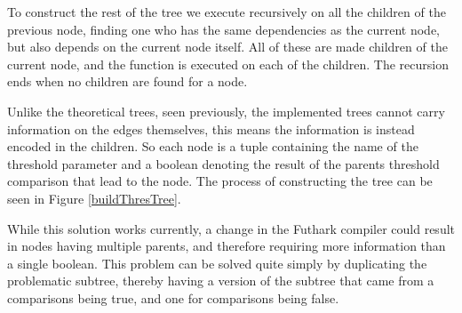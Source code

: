 To construct the rest of the tree we execute recursively on all the children
of the previous node, finding one who has the same dependencies as the current
node, but also depends on the current node itself. All of these are made
children of the current node, and the function is executed on each of the children. The
recursion ends when no children are found for a node.

Unlike the theoretical trees, seen previously, the implemented trees cannot carry information on
the edges themselves, this means the information is instead encoded in the
children. So each node is a tuple containing the name of the threshold
parameter and a boolean denoting the result of the parents threshold
comparison that lead to the node. The process of constructing the tree can be seen in Figure \ref{buildThresTree}.


While this solution works currently, a change in the Futhark compiler could
result in nodes having multiple parents, and therefore requiring more
information than a single boolean. This problem can be solved quite simply by
duplicating the problematic subtree, thereby having a version of the subtree that came from a
comparisons being true, and one for comparisons being false.


